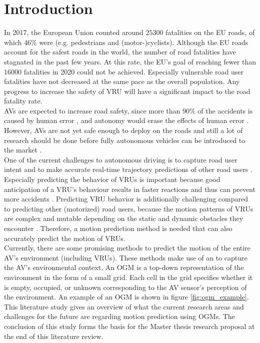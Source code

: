 \section{Introduction} \label{sec:intro}
In 2017, the European Union counted around $25300$ fatalities on the EU roads, of which 46\% were  (e.g. pedestrians and (motor-)cyclists). Although the EU roads account for the safest roads in the world, the number of road fatalities have stagnated in the past few years. At this rate, the EU's goal of reaching fewer than $16000$ fatalities in 2020 could not be achieved. Especially vulnerable road user fatalities have not decreased at the same pace as the overall population. Any progress to increase the safety of \gls{VRU} will have a significant impact to the road fatality rate. \cite{vademecumeu2018road} \\

\glspl{AV} are expected to increase road safety, since more than 90\% of the accidents is caused by human error \cite{eu2020website}, and autonomy would erase the effects of human error \cite{cui2019review}. However, \glspl{AV} are not yet safe enough to deploy on the roads and still a lot of research should be done before fully autonomous vehicles can be introduced to the market \cite{okuda2014survey} \cite{cui2019review}. \\

One of the current challenges to autonomous driving is to capture road user intent and to make accurate real-time trajectory predictions of other road users \cite{ohn2016looking}. Especially predicting the behavior of \glspl{VRU} is important \cite{ohn2016looking} \cite{cara2015classification} because good anticipation of a \gls{VRU}'s behaviour results in faster reactions and thus can prevent more accidents \cite{djuric2020uncertainty}. Predicting \gls{VRU} behavior is additionally challenging compared to predicting other (motorized) road users, because the motion patterns of \glspl{VRU} are complex and mutable depending on the static and dynamic obstacles they encounter \cite{chou2020predicting}. Therefore, a motion prediction method is needed that can also accurately predict the motion of \glspl{VRU}.\\

Currently, there are some promising methods to predict the motion of the entire \gls{AV}'s environment (including \glspl{VRU}). These methods make use of an  to capture the \gls{AV}'s environmental context. An \gls{OGM} is a top-down representation of the environment in the form of a small grid. Each cell in the grid specifies whether it is empty, occupied, or unknown corresponding to the \gls{AV} sensor's perception of the environment. An example of an \gls{OGM} is shown in figure \ref{fig:ogm_example}. This literature study gives an overview of what the current research areas and challenges for the future are regarding motion prediction using \glspl{OGM}. The conclusion of this study forms the basis for the Master thesis research proposal at the end of this literature review. \\


